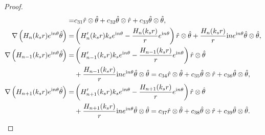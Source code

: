 \documentclass[11pt,reqno,twoside]{amsart}
\theoremstyle{definition}
\theoremstyle{remark}
\numberwithin{equation}{section}
\begin{document}
\begin{proof}
\begin{align}
					=&c_{31}\hat{r}\otimes\hat{\theta }+c_{32}\hat{\theta}\otimes\hat{r }+c_{33}\hat{\theta }\otimes\hat{\theta },\notag\\
					\nabla \left ( H_{n} (k_{s} r ) e^{\mathrm{i}n\theta } \hat{\theta}   \right )=&\left( H_{n}' (k_{s}r) k_{s}e^{\mathrm{i}n\theta } -\frac{H_{n} ( k_{s} r )}{r} e^{\mathrm{i}n\theta }\right)\hat{r}\otimes\hat{\theta }+\frac{H_{n} ( k_{s} r )}{r}\mathrm{i}ne^{\mathrm{i}n\theta }\hat{\theta }\otimes\hat{\theta },\notag\\
					\nabla \left ( H_{n-1} (k_{s} r ) e^{\mathrm{i}n\theta } \hat{\theta}   \right )=&\left( H_{n-1}' (k_{s}r) k_{s}e^{\mathrm{i}n\theta } -\frac{H_{n-1} ( k_{s} r )}{r} e^{\mathrm{i}n\theta }\right)\hat{r}\otimes\hat{\theta }\notag\\
					&+\frac{H_{n-1} ( k_{s} r )}{r}\mathrm{i}ne^{\mathrm{i}n\theta }\hat{\theta }\otimes\hat{\theta }=c_{34}\hat{r}\otimes\hat{\theta }+c_{35}\hat{\theta}\otimes\hat{r }+c_{36}\hat{\theta }\otimes\hat{\theta },\notag\\
					\nabla \left ( H_{n+1} (k_{s} r ) e^{\mathrm{i}n\theta } \hat{\theta}   \right )=&\left( H_{n+1}' (k_{s}r) k_{s}e^{\mathrm{i}n\theta } -\frac{H_{n+1} ( k_{s} r )}{r} e^{\mathrm{i}n\theta }\right)\hat{r}\otimes\hat{\theta }\notag\\
					&+\frac{H_{n+1} ( k_{s} r )}{r}\mathrm{i}ne^{\mathrm{i}n\theta }\hat{\theta }\otimes\hat{\theta }=c_{37}\hat{r}\otimes\hat{\theta }+c_{38}\hat{\theta}\otimes\hat{r }+c_{39}\hat{\theta }\otimes\hat{\theta }.\notag
				\end{align}
				

\end{proof}
\end{document}

